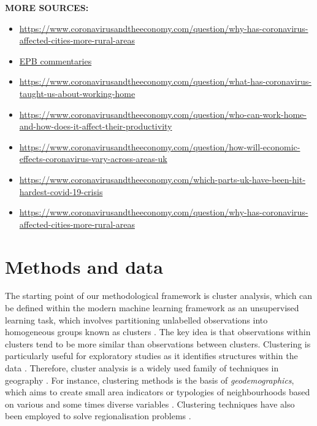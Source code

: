 \documentclass[]{interact}
\theoremstyle{plain}%
\theoremstyle{definition}
\theoremstyle{remark}
\def\tightlist{}
\begin{document}
\textbf{MORE SOURCES:}

\begin{itemize}
\tightlist
\item
  \url{https://www.coronavirusandtheeconomy.com/question/why-has-coronavirus-affected-cities-more-rural-areas}
\item
  \href{https://journals.sagepub.com/toc/EPB/current}{EPB commentaries}
\item
  \url{https://www.coronavirusandtheeconomy.com/question/what-has-coronavirus-taught-us-about-working-home}
\item
  \url{https://www.coronavirusandtheeconomy.com/question/who-can-work-home-and-how-does-it-affect-their-productivity}
\item
  \url{https://www.coronavirusandtheeconomy.com/question/how-will-economic-effects-coronavirus-vary-across-areas-uk}
\item
  \url{https://www.coronavirusandtheeconomy.com/which-parts-uk-have-been-hit-hardest-covid-19-crisis}
\item
  \url{https://www.coronavirusandtheeconomy.com/question/why-has-coronavirus-affected-cities-more-rural-areas}
\end{itemize}

\hypertarget{methods-and-data}{%
\section{Methods and data}\label{methods-and-data}}

The starting point of our methodological framework is cluster analysis,
which can be defined within the modern machine learning framework as an
unsupervised learning task, which involves partitioning unlabelled
observations into homogeneous groups known as clusters
\citep{montero2014tsclust}. The key idea is that observations within
clusters tend to be more similar than observations between clusters.
Clustering is particularly useful for exploratory studies as it
identifies structures within the data \citep{aghabozorgi2015time}.
Therefore, cluster analysis is a widely used family of techniques in
geography \citep{gordon1977classification, everitt1974cluster}. For
instance, clustering methods is the basis of \emph{geodemographics},
which aims to create small area indicators or typologies of
neighbourhoods based on various and some times diverse variables
\citep{SINGLETON2009289, harris2005geodemographics}. Clustering
techniques have also been employed to solve regionalisation problems
\citep{niesterowicz2016}.
\end{document}
